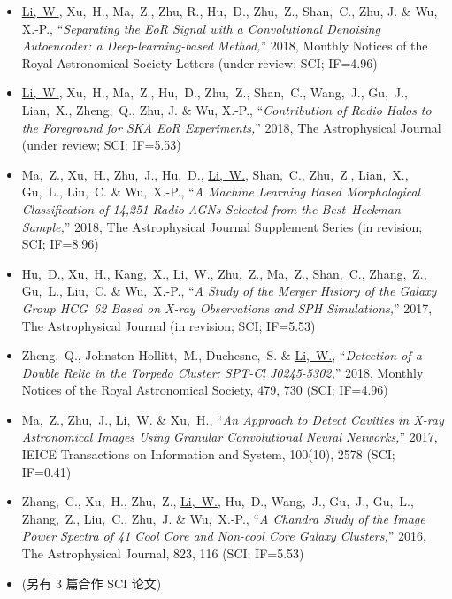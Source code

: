 \documentclass[zh]{resume}
\begin{document}
\begin{itemize}
  \small
  \item \uline{Li,~W.}, Xu,~H., Ma,~Z., Zhu, R., Hu,~D., Zhu,~Z.,
    Shan,~C., Zhu, J. \& Wu, X.-P.,
    \enquote{\it Separating the EoR Signal with a Convolutional Denoising
      Autoencoder: a Deep-learning-based Method,}
    2018, Monthly Notices of the Royal Astronomical Society Letters
    (under review; SCI; IF=4.96)
  \item \uline{Li,~W.}, Xu,~H., Ma,~Z., Hu,~D., Zhu,~Z., Shan,~C.,
    Wang,~J., Gu,~J., Lian,~X., Zheng,~Q., Zhu, J. \& Wu, X.-P.,
    \enquote{\it Contribution of Radio Halos to the Foreground for
      SKA EoR Experiments,}
    2018, The Astrophysical Journal (under review; SCI; IF=5.53)
  \item Ma,~Z., Xu,~H., Zhu,~J., Hu,~D., \uline{Li,~W.}, Shan,~C., Zhu,~Z.,
    Lian,~X., Gu,~L., Liu,~C. \& Wu,~X.-P.,
    \enquote{\it A Machine Learning Based Morphological Classification
      of 14,251 Radio AGNs Selected from the Best--Heckman Sample,}
    2018, The Astrophysical Journal Supplement Series
    (in revision; SCI; IF=8.96)
  \item Hu,~D., Xu,~H., Kang,~X., \uline{Li,~W.}, Zhu,~Z., Ma,~Z.,
    Shan,~C., Zhang,~Z., Gu,~L., Liu,~C. \& Wu,~X.-P.,
    \enquote{\it A Study of the Merger History of the Galaxy Group
      HCG~62 Based on X-ray Observations and SPH Simulations,}
    2017, The Astrophysical Journal
    (in revision; SCI; IF=5.53)
  \item Zheng,~Q., Johnston-Hollitt,~M., Duchesne,~S. \& \uline{Li,~W.},
    \enquote{\it Detection of a Double Relic in the Torpedo Cluster:
      SPT-Cl J0245-5302,}
    2018, Monthly Notices of the Royal Astronomical Society, 479, 730
    (SCI; IF=4.96)
  \item Ma,~Z., Zhu,~J., \uline{Li,~W.} \& Xu,~H.,
    \enquote{\it An Approach to Detect Cavities in X-ray Astronomical
      Images Using Granular Convolutional Neural Networks,}
    2017, IEICE Transactions on Information and System, 100(10), 2578
    (SCI; IF=0.41)
  \item Zhang,~C., Xu,~H., Zhu,~Z., \uline{Li,~W.}, Hu,~D., Wang,~J.,
    Gu,~J., Gu,~L., Zhang,~Z., Liu,~C., Zhu,~J. \& Wu,~X.-P.,
    \enquote{\it A Chandra Study of the Image Power Spectra of 41
      Cool Core and Non-cool Core Galaxy Clusters,}
    2016, The Astrophysical Journal, 823, 116 (SCI; IF=5.53)
  \item (另有 3 篇合作 SCI 论文)
\end{itemize}
\end{document}
